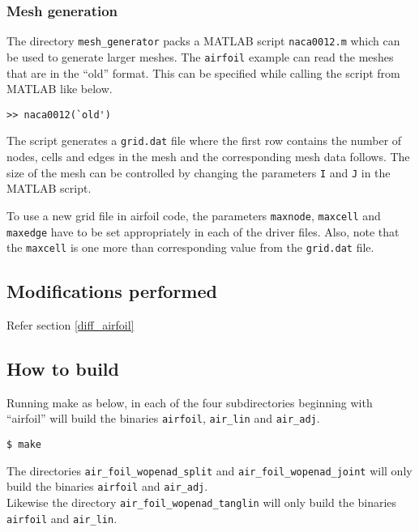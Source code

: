 \subsubsection{Mesh generation}\label{mesh_gen}
The directory \texttt{mesh\_generator} packs a MATLAB script \texttt{naca0012.m} which can be used to generate larger meshes. The \texttt{airfoil} example can read the meshes that are in the ``old'' format. This can be specified while calling the script from MATLAB like below.
\hfill\break
\begin{lstlisting}[language=mymatlab, numbers=none]
>> naca0012(`old')
\end{lstlisting}
The script generates a \texttt{grid.dat} file where the first row contains the number of nodes, cells and edges in the mesh and the corresponding mesh data follows. The size of the mesh can be controlled by changing the parameters \texttt{I} and \texttt{J} in the MATLAB script.

\begin{NotePar}
\noindent To use a new grid file in airfoil code, the parameters \texttt{maxnode}, \texttt{maxcell} and \texttt{maxedge} have to be set appropriately in each of the driver files. Also, note that the \texttt{maxcell} is one more than corresponding value from the \texttt{grid.dat} file.
\end{NotePar}
\subsection{Modifications performed}
Refer section \ref{diff_airfoil}
\subsection{How to build}
Running make as below, in each of the four subdirectories beginning with ``airfoil'' will build the  binaries \texttt{airfoil}, \texttt{air\_lin} and \texttt{air\_adj}.
\hfill\break
\begin{lstlisting}[language=mybash, numbers=none]
    $ make
\end{lstlisting}
\begin{NotePar}
\noindent  The directories \texttt{air\_foil\_wopenad\_split} and \texttt{air\_foil\_wopenad\_joint} will only build the binaries \texttt{airfoil} and \texttt{air\_adj}.\\

\noindent Likewise the directory \texttt{air\_foil\_wopenad\_tanglin} will only build the binaries \texttt{airfoil} and \texttt{air\_lin}.
\end{NotePar}
